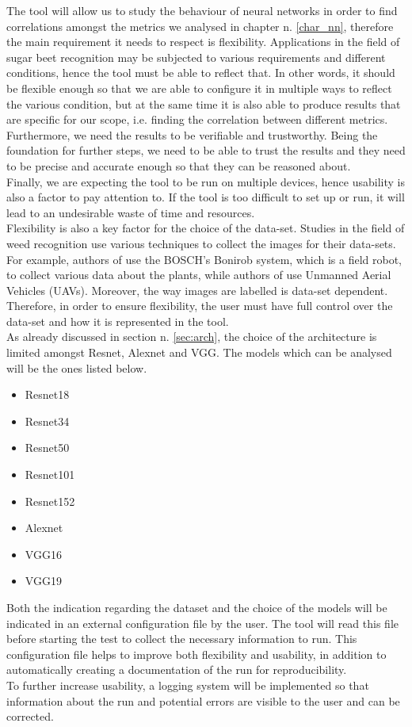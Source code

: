 The tool will allow us to study the behaviour of neural networks in order to find correlations amongst the metrics we analysed in chapter n. \ref{char_nn}, therefore the main requirement it needs to respect is flexibility. Applications in the field of sugar beet recognition may be subjected to various requirements and different conditions, hence the tool must be able to reflect that. In other words, it should be flexible enough so that we are able to configure it in multiple ways to reflect the various condition, but at the same time it is also able to produce results that are specific for our scope, i.e. finding the correlation between different metrics. Furthermore, we need the results to be verifiable and trustworthy. Being the foundation for further steps, we need to be able to trust the results and they need to be precise and accurate enough so that they can be reasoned about. \\
Finally, we are expecting the tool to be run on multiple devices, hence usability is also a factor to pay attention to. If the tool is too difficult to set up or run, it will lead to an undesirable waste of time and resources. \\
Flexibility is also a key factor for the choice of the data-set. Studies in the field of weed recognition use various techniques to collect the images for their data-sets. For example, authors of \cite{lu_survey_2020} use the BOSCH’s Bonirob system, which is a field robot, to collect various data about the plants, while authors of \cite{rs10111690} use Unmanned Aerial Vehicles (UAVs). Moreover, the way images are labelled is data-set dependent. 
Therefore, in order to ensure flexibility, the user must have full control over the data-set and how it is represented in the tool. \\
As already discussed in section n. \ref{sec:arch},  the choice of the architecture is limited amongst Resnet, Alexnet and VGG. The models which can be analysed will be the ones listed below. 
\begin{itemize}
\item Resnet18
\item Resnet34
\item Resnet50
\item Resnet101
\item Resnet152
\item Alexnet
\item VGG16
\item VGG19
\end{itemize}
Both the indication regarding the dataset and the choice of the models will be indicated in an external configuration file by the user. The tool will read this file before starting the test to collect the necessary information to run. This configuration file helps to improve both flexibility and usability, in addition to automatically creating a documentation of the run for reproducibility. \\
To further increase usability, a logging system will be implemented so that information about the run and potential errors are visible to the user and can be corrected. \\

